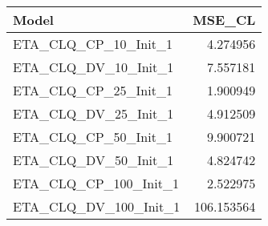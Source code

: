 \begin{table}
\centering
\begin{tabular}[t]{lr}
\toprule
\textbf{Model} & \textbf{MSE\_CL}\\
\midrule
\midrule
ETA\_CLQ\_CP\_10\_Init\_1 & 4.274956\\
\midrule
ETA\_CLQ\_DV\_10\_Init\_1 & 7.557181\\
\midrule
ETA\_CLQ\_CP\_25\_Init\_1 & 1.900949\\
\midrule
ETA\_CLQ\_DV\_25\_Init\_1 & 4.912509\\
\midrule
ETA\_CLQ\_CP\_50\_Init\_1 & 9.900721\\
\midrule
ETA\_CLQ\_DV\_50\_Init\_1 & 4.824742\\
\midrule
ETA\_CLQ\_CP\_100\_Init\_1 & 2.522975\\
\midrule
ETA\_CLQ\_DV\_100\_Init\_1 & 106.153564\\
\bottomrule
\end{tabular}
\end{table}